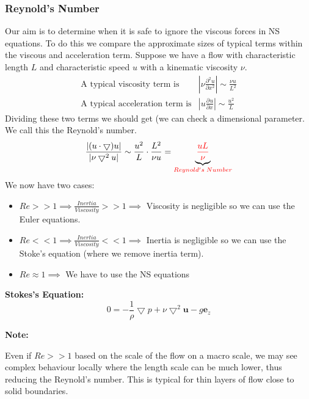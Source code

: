 \documentclass[11pt]{article}
\newcommand*{\pd}[3][]{\ensuremath{\frac{\partial^{#1} {#2}}{\partial {#3}^{#1}}}}
\newcommand{\grad}{\bigtriangledown}
\newcommand{\mv}[1]{\bm{#1}}
\newcommand{\mdf}[1]{{\color{red}#1}}
\newenvironment{note}
    {\textbf{Note:}\begin{mdframed}[backgroundcolor=white, roundcorner=5pt, linewidth=0pt]}
    {\end{mdframed}}
\newenvironment{formula}
	{\begin{mdframed}[backgroundcolor=white, roundcorner=5pt, linewidth=1pt, linecolor=red]}
	{\end{mdframed}}
\begin{document}
\subsubsection{Reynold's Number}
Our aim is to determine when it is safe to ignore the viscous forces in NS equations.
To do this we compare the approximate sizes of typical terms within the viscous and acceleration term.
Suppose we have a flow with characteristic length $L$ and characteristic speed $u$ with a kinematic viscosity $\nu$.
\begin{align*}
	\text{A typical viscosity term is} &\left|\nu\pd[2]{u}{x}\right|\sim\frac{\nu u}{L^2}\\
	\text{A typical acceleration term is} &\left|u\pd{u}{x}\right|\sim\frac{u^2}{L}
\end{align*}
Dividing these two terms we should get (we can check a dimensional parameter. We call this the \mdf{Reynold's number}.
$$\frac{|(u\cdot\grad)u|}{|\nu\grad^2 u|}\sim \frac{u^2}{L}\cdot\frac{L^2}{\nu u}=\underbrace{\mdf{\frac{uL}{\nu}}}_{\mdf{Reynold's\;Number}}$$
We now have two cases:
\begin{itemize}
	\item $Re >> 1 \implies \frac{Inertia}{Viscosity} >> 1 \implies$ Viscosity is negligible so we can use the Euler equations.
	\item $Re << 1 \implies \frac{Inertia}{Viscosity} << 1 \implies$ Inertia is negligible so we can use the Stoke's equation (where we remove inertia term).
	\item $Re \approx 1 \implies$ We have to use the NS equations
\end{itemize}
\begin{formula}
	\textbf{Stokes's Equation:}
	$$0=-\frac{1}{\rho}\grad{p}+\nu\grad^2\mv{u}-g\mv{e}_z$$
\end{formula}
\begin{note}
Even if $Re >> 1$ based on the scale of the flow on a macro scale, we may see complex behaviour locally where the length scale can be much lower, thus reducing the Reynold's number. This is typical for thin layers of flow close to solid boundaries.
\end{note}
\end{document}
